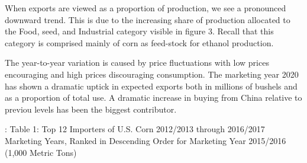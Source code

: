\documentclass[
  letterpaper,
  DIV=11,
  numbers=noendperiod]{scrreprt}
\begin{document}
When exports are viewed as a proportion of production, we see a
pronounced downward trend. This is due to the increasing share of
production allocated to the Food, seed, and Industrial category visible
in figure 3. Recall that this category is comprised mainly of corn as
feed-stock for ethanol production.

The year-to-year variation is caused by price fluctuations with low
prices encouraging and high prices discouraging consumption. The
marketing year 2020 has shown a dramatic uptick in expected exports both
in millions of bushels and as a proportion of total use. A dramatic
increase in buying from China relative to previou levels has been the
biggest contributor.

: Table 1: Top 12 Importers of U.S. Corn 2012/2013 through 2016/2017
Marketing Years, Ranked in Descending Order for Marketing Year 2015/2016
(1,000 Metric Tons)
\end{document}
